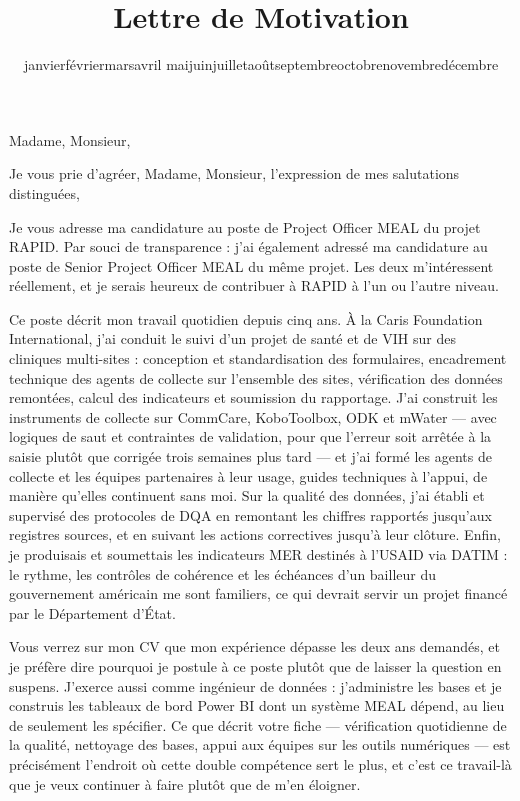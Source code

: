 \documentclass[10pt,a4paper,sans]{moderncv}
\title{Lettre de Motivation}
\renewcommand{\today}{\number\day\space\ifcase\month\or janvier\or février\or mars\or avril\or
mai\or juin\or juillet\or août\or septembre\or octobre\or novembre\or décembre\fi\space\number\year}
\begin{document}
\date{\today}
\opening{Madame, Monsieur,}
\closing{Je vous prie d'agréer, Madame, Monsieur, l'expression de mes salutations distinguées,}

\makelettertitle

Je vous adresse ma candidature au poste de Project Officer MEAL du projet RAPID. Par souci de transparence : j'ai également adressé ma candidature au poste de Senior Project Officer MEAL du même projet. Les deux m'intéressent réellement, et je serais heureux de contribuer à RAPID à l'un ou l'autre niveau.

Ce poste décrit mon travail quotidien depuis cinq ans. À la Caris Foundation International, j'ai conduit le suivi d'un projet de santé et de VIH sur des cliniques multi-sites : conception et standardisation des formulaires, encadrement technique des agents de collecte sur l'ensemble des sites, vérification des données remontées, calcul des indicateurs et soumission du rapportage. J'ai construit les instruments de collecte sur CommCare, KoboToolbox, ODK et mWater --- avec logiques de saut et contraintes de validation, pour que l'erreur soit arrêtée à la saisie plutôt que corrigée trois semaines plus tard --- et j'ai formé les agents de collecte et les équipes partenaires à leur usage, guides techniques à l'appui, de manière qu'elles continuent sans moi. Sur la qualité des données, j'ai établi et supervisé des protocoles de DQA en remontant les chiffres rapportés jusqu'aux registres sources, et en suivant les actions correctives jusqu'à leur clôture. Enfin, je produisais et soumettais les indicateurs MER destinés à l'USAID via DATIM : le rythme, les contrôles de cohérence et les échéances d'un bailleur du gouvernement américain me sont familiers, ce qui devrait servir un projet financé par le Département d'État.

Vous verrez sur mon CV que mon expérience dépasse les deux ans demandés, et je préfère dire pourquoi je postule à ce poste plutôt que de laisser la question en suspens. J'exerce aussi comme ingénieur de données : j'administre les bases et je construis les tableaux de bord Power BI dont un système MEAL dépend, au lieu de seulement les spécifier. Ce que décrit votre fiche --- vérification quotidienne de la qualité, nettoyage des bases, appui aux équipes sur les outils numériques --- est précisément l'endroit où cette double compétence sert le plus, et c'est ce travail-là que je veux continuer à faire plutôt que de m'en éloigner.
\end{document}
